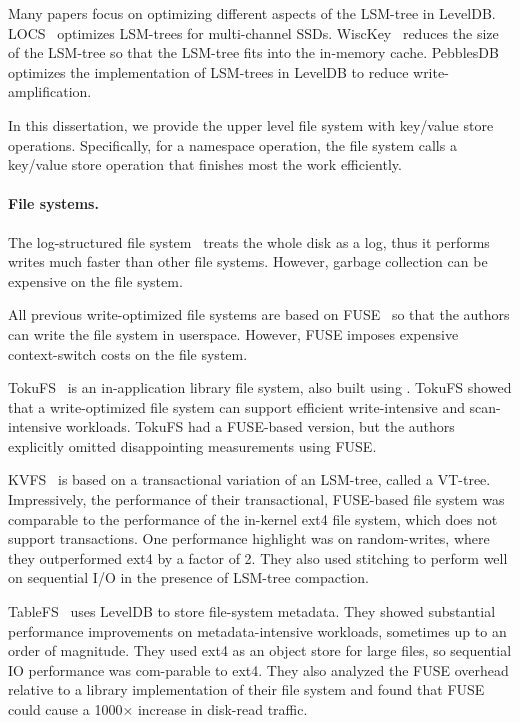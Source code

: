 Many papers focus on optimizing different aspects of the LSM-tree in LevelDB.
LOCS~\citep{locs} optimizes LSM-trees for multi-channel SSDs.
WiscKey~\citep{wisckey} reduces the size of the LSM-tree
so that the LSM-tree fits into the in-memory cache.
PebblesDB~\citep{pebble} optimizes the implementation of LSM-trees in LevelDB to
reduce write-amplification.

In this dissertation,
we provide the upper level file system with key/value store operations.
Specifically, for a namespace operation, the file system calls a key/value
store operation that finishes most the work efficiently.

\paragraph{File systems.}
The log-structured file system~\citep{lfs} treats the whole disk as a log,
thus it performs writes much faster than other file systems.
However, garbage collection can be expensive on the file system.

All previous write-optimized file systems are based on FUSE~\citep{fuse} so that
the authors can write the file system in userspace.
However, FUSE imposes expensive context-switch costs on the file system.

TokuFS~\citep{tokufs} is an in-application library file system, also built using
\bets.
TokuFS showed that a write-optimized file system can support efficient
write-intensive and scan-intensive workloads.
TokuFS had a FUSE-based version, but the authors explicitly omitted
disappointing measurements using FUSE.

KVFS~\citep{kvfs} is based on a transactional variation of an LSM-tree, called a
VT-tree.
Impressively, the performance of their transactional, FUSE-based file system was
comparable to the performance of the in-kernel ext4 file system,
which does not support transactions.
One performance highlight was on random-writes, where they outperformed ext4 by
a factor of 2.
They also used stitching to perform well on sequential I/O in the presence of
LSM-tree compaction.

TableFS~\citep{tablefs} uses LevelDB to store file-system metadata.
They showed substantial performance improvements on metadata-intensive
workloads, sometimes up to an order of magnitude.
They used ext4 as an object store for large files, so sequential IO performance
was com-parable to ext4.
They also analyzed the FUSE overhead relative to a library implementation of
their file system and found that FUSE could cause a 1000× increase in disk-read
traffic.


